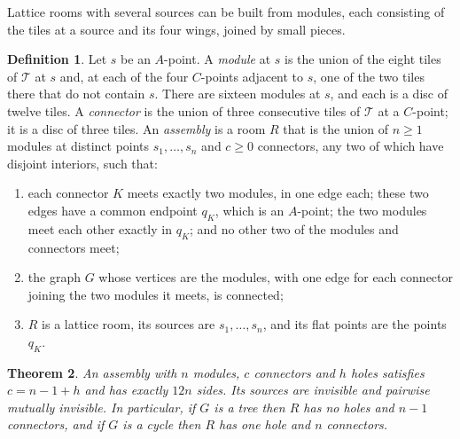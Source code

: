 \documentclass[11pt,a4paper]{article}
\theoremstyle{plain}
\newtheorem{theorem}{Theorem}[section]
\theoremstyle{definition}
\newtheorem{definition}[theorem]{Definition}
\theoremstyle{remark}
\newcommand{\T}{\mathcal{T}}
\numberwithin{equation}{section}
\begin{document}
Lattice rooms with several sources can be built from modules, each consisting of the tiles at a source and its four wings, joined by small pieces.

\begin{definition}\label{def:assembly}
Let $s$ be an $A$-point. A \emph{module} at $s$ is the union of the eight tiles of $\T$ at $s$ and, at each of the four $C$-points adjacent to $s$, one of the two tiles there that do not contain $s$. There are sixteen modules at $s$, and each is a disc of twelve tiles. A \emph{connector} is the union of three consecutive tiles of $\T$ at a $C$-point; it is a disc of three tiles. An \emph{assembly} is a room $R$ that is the union of $n\ge1$ modules at distinct points $s_1,\dots,s_n$ and $c\ge0$ connectors, any two of which have disjoint interiors, such that:
\begin{enumerate}[label=\textup{(\roman*)}]
\item each connector $K$ meets exactly two modules, in one edge each; these two edges have a common endpoint $q_K$, which is an $A$-point; the two modules meet each other exactly in $q_K$; and no other two of the modules and connectors meet;
\item the graph $G$ whose vertices are the modules, with one edge for each connector joining the two modules it meets, is connected;
\item $R$ is a lattice room, its sources are $s_1,\dots,s_n$, and its flat points are the points $q_K$.
\end{enumerate}
\end{definition}

\begin{theorem}\label{thm:assembly}
An assembly with $n$ modules, $c$ connectors and $h$ holes satisfies $c=n-1+h$ and has exactly $12n$ sides. Its sources are invisible and pairwise mutually invisible. In particular, if $G$ is a tree then $R$ has no holes and $n-1$ connectors, and if $G$ is a cycle then $R$ has one hole and $n$ connectors.
\end{theorem}
\end{document}
